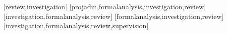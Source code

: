 \documentclass[spanish]{textolivre}
\begin{document}
\begin{contributors}
[review,investigation]
[projadm,formalanalysis,investigation,review]
[investigation,formalanalysis,review]
[formalanalysis,investigation,review]
[investigation,formalanalysis,review,supervision]
\end{contributors}
\end{document}
